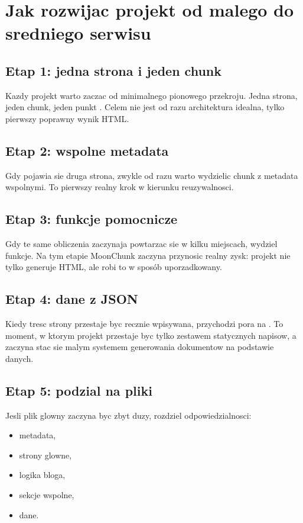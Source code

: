 \chapter{Jak rozwijac projekt od malego do sredniego serwisu}

\section{Etap 1: jedna strona i jeden chunk}
Kazdy projekt warto zaczac od minimalnego pionowego przekroju. Jedna strona, jeden chunk,
jeden punkt . Celem nie jest od razu architektura idealna, tylko pierwszy
poprawny wynik HTML.

\section{Etap 2: wspolne metadata}
Gdy pojawia sie druga strona, zwykle od razu warto wydzielic chunk z metadata wspolnymi.
To pierwszy realny krok w kierunku reuzywalnosci.

\section{Etap 3: funkcje pomocnicze}
Gdy te same obliczenia zaczynaja powtarzac sie w kilku miejscach, wydziel funkcje.
Na tym etapie MoonChunk zaczyna przynosic realny zysk: projekt nie tylko generuje HTML,
ale robi to w sposób uporzadkowany.

\section{Etap 4: dane z JSON}
Kiedy tresc strony przestaje byc recznie wpisywana, przychodzi pora na .
To moment, w ktorym projekt przestaje byc tylko zestawem statycznych napisow, a zaczyna
stac sie malym systemem generowania dokumentow na podstawie danych.

\section{Etap 5: podzial na pliki}
Jesli plik glowny zaczyna byc zbyt duzy, rozdziel odpowiedzialnosci:

\begin{itemize}
  \item metadata,
  \item strony glowne,
  \item logika bloga,
  \item sekcje wspolne,
  \item dane.
\end{itemize}

